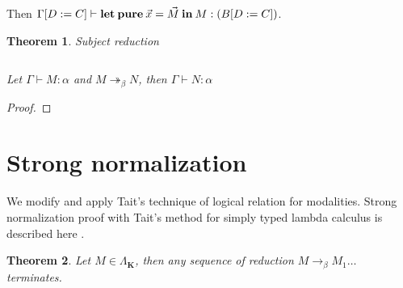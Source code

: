 \documentclass[a4paper]{article}
\newtheorem{theorem}{Theorem}
\begin{document}
  Then $\Gamma [D := C] \vdash {\bf let \: pure } \: \vec{x} = \vec{M} \: {\bf in} \: M : {\bf } (B [D := C])$.



  \begin{theorem} Subject reduction

  $ $

  Let $\Gamma \vdash M : \alpha$ and $M \twoheadrightarrow_{\beta} N$, then $\Gamma \vdash N : \alpha$

  \end{theorem}

  \begin{proof}

  \end{proof}


  \vspace{\baselineskip}


\section{Strong normalization}

  We modify and apply Tait's technique of logical relation for modalities. Strong normalization proof with Tait's method for simply typed lambda calculus is described here \cite{Pierce}.


  \begin{theorem}

    Let $M \in \Lambda_{\textbf{K}}$, then any sequence of reduction $M \rightarrow_{\beta} M_1 \dots$ terminates.

  \end{theorem}
\end{document}
